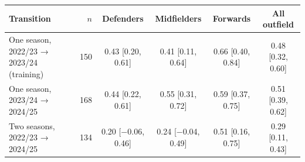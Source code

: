 \begin{tabular}{lrcccc}
\toprule
Transition & $n$ & Defenders & Midfielders & Forwards & All outfield \\
\midrule
One season, 2022/23 → 2023/24 (training) & 150 & 0.43 [0.20, 0.61] & 0.41 [0.11, 0.64] & 0.66 [0.40, 0.84] & 0.48 [0.32, 0.60] \\
One season, 2023/24 → 2024/25 & 168 & 0.44 [0.22, 0.61] & 0.55 [0.31, 0.72] & 0.59 [0.37, 0.75] & 0.51 [0.39, 0.62] \\
Two seasons, 2022/23 → 2024/25 & 134 & 0.20 [$-$0.06, 0.46] & 0.24 [$-$0.04, 0.49] & 0.51 [0.16, 0.75] & 0.29 [0.11, 0.43] \\
\bottomrule
\end{tabular}
